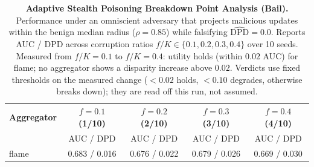 \begin{table}[t]
\centering
\small
\caption{\textbf{Adaptive Stealth Poisoning Breakdown Point Analysis (Bail).}
Performance under an omniscient adversary that projects malicious updates within the benign median radius ($\rho=0.85$) while falsifying $\widehat{\text{DPD}} = 0.0$.
Reports AUC / DPD across corruption ratios $f/K \in \{0.1, 0.2, 0.3, 0.4\}$ over 10 seeds.
Measured from $f/K = 0.1$ to $f/K = 0.4$: utility holds (within $0.02$ AUC) for flame; no aggregator shows a disparity increase above $0.02$. Verdicts use fixed thresholds on the measured change ($<0.02$ holds, $<0.10$ degrades, otherwise breaks down); they are read off this run, not assumed.}
\label{tab:adaptive_poisoner}
\begin{tabular}{lcccc}
\toprule
\textbf{Aggregator} & \textbf{$f=0.1$ (1/10)} & \textbf{$f=0.2$ (2/10)} & \textbf{$f=0.3$ (3/10)} & \textbf{$f=0.4$ (4/10)} \\
 & AUC / DPD & AUC / DPD & AUC / DPD & AUC / DPD \\
\midrule
flame & 0.683 / 0.016 & 0.676 / 0.022 & 0.679 / 0.026 & 0.669 / 0.030 \\
\bottomrule
\end{tabular}
\end{table}
